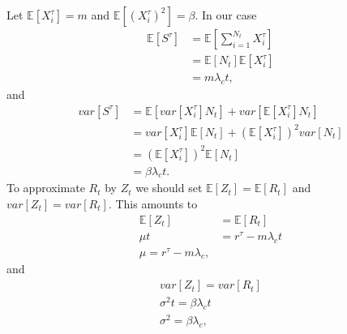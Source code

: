 \documentclass[a4paper,english,12pt]{article}
\begin{document}
Let $\mathbb{E}[X_i^\tau]=m$ and $\mathbb{E}[(X_i^\tau)^2]=\beta$. In our case
\begin{align*}
\mathbb{E}[S^\tau]&=\mathbb{E}\left[\sum_{i=1}^{N_t}X_i^\tau\right]\\
				&=\mathbb{E}[N_t]\mathbb{E}[X_i^\tau]\\
				&=m\lambda_c t,
\end{align*}
and
\begin{align*}
var[S^\tau]&=\mathbb{E}[var[X_i^\tau]N_t]+var[\mathbb{E}[X_i^\tau]N_t]\\
				&=var[X_i^\tau]\mathbb{E}[N_t]+(\mathbb{E}[X_i^\tau])^2var[N_t]\\
				&=(\mathbb{E}[X_i^\tau])^2\mathbb{E}[N_t]\\
				&=\beta\lambda_c t.
\end{align*}
To approximate $R_t$ by $Z_t$ we should set $\mathbb{E}[Z_t]=\mathbb{E}[R_t]$ and $var[Z_t]=var[R_t]$. This amounts to
\begin{align*}
\mathbb{E}[Z_t]&=\mathbb{E}[R_t]\\
\mu t &=r^\tau -m\lambda_c t\\
\mu=r^\tau-m\lambda_c,
\end{align*}
and
\begin{align*}
var[Z_t]=var[R_t]\\
\sigma^2t=\beta\lambda_c t\\
\sigma^2=\beta\lambda_c,
\end{align*}
\end{document}
